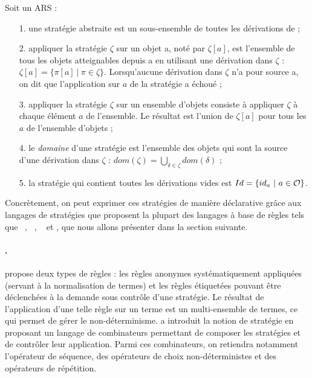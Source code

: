 \begin{definition}%
  Soit un ARS \caA :
  \begin{itemize}
    \item[1.] une stratégie abstraite  est un sous-ensemble de toutes les
      dérivations de \caA ;

    \item[2.] appliquer la stratégie $\zeta$ sur un objet a, noté par $\zeta[a]$, est
      l'ensemble de tous les objets atteignables depuis a en utilisant une
      dérivation dans $\zeta$ :
      $\zeta[a] = \{\pi[a]~|~\pi \in \zeta\}$. Lorsqu'aucune dérivation dans
      $\zeta$ n'a pour source a, on dit que l'application sur $a$ de la
      stratégie a échoué ;

    \item[3.] appliquer la stratégie $\zeta$ sur un ensemble d'objets consiste
      à appliquer $\zeta$ à chaque élément $a$ de l'ensemble. Le résultat est
      l'union de $\zeta[a]$ pour tous les $a$ de l'ensemble d'objets ;

    \item[4.] le \emph{domaine} d'une stratégie est l'ensemble des objets qui
      sont la source d'une dérivation dans $\zeta$ : $dom(\zeta) =
      \bigcup \limits_{\delta \in \zeta} dom(\delta)$ ;

    \item[5.] la stratégie qui contient toutes les dérivations vides est $Id = \{
      id_a ~|~ a \in \mathcal{O}\}$.
  \end{itemize}
\end{definition}


Concrètement, on peut exprimer ces stratégies de manière déclarative grâce aux
langages de stratégies que proposent la plupart des langages à base de règles
tels que {\elan}~\cite{Vittek1994,Borovansky1998,Borovansky1996},
{\stratego}~\cite{Visser1998,Visser01},
{\maude}~\cite{Clavel1996a,Clavel2002,Clavel2011} et {\tom}, que
nous allons présenter dans la section suivante.

\paragraph{{\elan}.} {\elan} propose deux types de règles : les
règles anonymes systématiquement appliquées (servant à la normalisation de
termes) et les règles étiquetées pouvant être déclenchées à la demande
sous contrôle d'une stratégie.  Le résultat de l'application d'une telle règle
sur un terme est un multi-ensemble de termes, ce qui permet de gérer le
non-déterminisme. {\elan} a introduit la notion de stratégie en proposant un
langage de combinateurs permettant de composer les stratégies et de contrôler
leur application. Parmi ces combinateurs, on retiendra notamment l'opérateur de
séquence, des opérateurs de choix non-déterministes et des opérateurs de
répétition.

